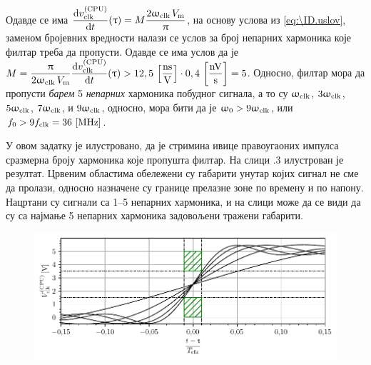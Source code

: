     
    Одавде се има 
    $\dfrac{{\rm d} v_{\rm clk}^{\rm (CPU)}}{{\rm d} t} (\uptau)
    = 
    M
    \dfrac{ 2
        \upomega_{\rm clk} \, 
        V_{\rm m} }{\uppi} 
    $, на основу услова из \eqref{eq:\ID.uslov}, заменом бројевних вредности налази се услов 
    за број непарних хармоника које филтар треба да пропусти. Одавде се има услов да је 
    $M = 
    \dfrac{\uppi} { 2
        \upomega_{\rm clk} \, 
        V_{\rm m} } 
    \dfrac{{\rm d} v_{\rm clk}^{\rm (CPU)}}{{\rm d} t} (\uptau)
    > 12,5 \,\left[\mathrm{\dfrac{ns}{V}}\right] \cdot 0,4 \,\left[\mathrm{\dfrac{nV}{s}}\right] = 5$. Односно, филтар мора да пропусти
    \textit{барем} 5 \textit{непарних} хармоника побудног сигнала, а то су
    $\upomega_{\rm clk}$, $3\upomega_{\rm clk}$, $5\upomega_{\rm clk}$, $7\upomega_{\rm clk}$, и
    $9\upomega_{\rm clk}$, односно, мора бити да је 
    $\upomega_0 > 9\upomega_{\rm clk}$, или 
    $f_0 > 9f_{\rm clk} = 36\,\left[\mathrm{MHz}\right]$.    
 
    У овом задатку је илустровано, да је стримина ивице правоугаоних импулса сразмерна
    броју хармоника које пропушта филтар. На слици \ID.3 илустрован је резултат. 
    Црвеним областима обележени су габарити унутар којих сигнал не сме да пролази, 
    односно назначене су границе прелазне зоне по времену и по напону. Нацртани су сигнали 
    са 1--5 непарних хармоника, и на слици може да се види да су са најмање 5
    непарних хармоника задовољени
    тражени габарити. 

    \begin{figure}[ht!]
        \centering
        \includegraphics[scale=1]{fig/proc_plot.pdf} 
        \caption{}
    \end{figure}